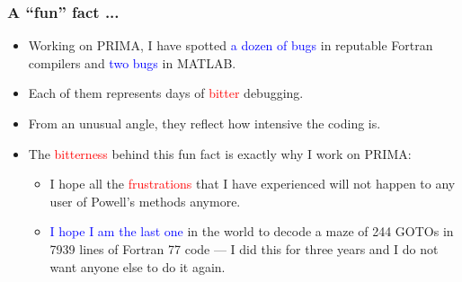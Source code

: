 \documentclass[slidestop,mathserif,xcolor=dvipsnames]{beamer}
\newcommand{\blue}[1]{\textcolor{blue}{#1}}
\newcommand{\red}[1]{\textcolor{red}{#1}}
\begin{document}
\begin{frame}
    \frametitle{A ``fun'' fact ...}

                 \vspace{1ex}
    \begin{itemize}
        \item
            Working on PRIMA, I have spotted \blue{a dozen of bugs} in reputable Fortran
            compilers and \blue{two bugs} in MATLAB.
                 \vspace{1ex}
        \item Each of them represents days of \red{bitter} debugging.
                 \vspace{1ex}
        \item From an unusual angle, they reflect how intensive the coding is.
                 \vspace{1ex}
        \item The \red{bitterness} behind this fun fact is exactly why I work on PRIMA:
                 \vspace{0.6ex}
                 \begin{itemize}
                    \normalsize
                \item
                    {I hope all the \red{frustrations} that I have experienced will not
                    happen to any user of Powell's methods anymore.}
                 \vspace{0.6ex}
             \item \blue{I hope I am the last one} in the world to decode a maze of 244 GOTOs in 7939 lines of Fortran 77 code
--- I did this for three years and I do not want anyone else to do it again.
            \end{itemize}
    \end{itemize}
\end{frame}
\end{document}
